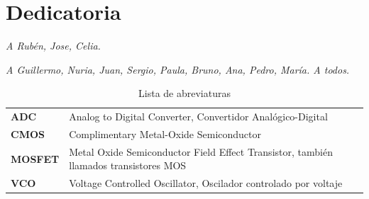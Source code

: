 \documentclass[12pt]{report} %
\begin{document}
\chapter*{Dedicatoria}

\setcounter{page}{5}
	
	\begin{center}
		\textit{A Rubén, Jose, Celia.}
	\end{center}

	\begin{center}
		\textit{A Guillermo, Nuria, Juan, Sergio, Paula, Bruno, Ana, Pedro, María. A todos.}
	\end{center}
	\vfill
	
	\newpage %
	\thispagestyle{empty}
	\mbox{}
	


\tableofcontents
\thispagestyle{fancy}


\listoffigures
\thispagestyle{fancy}


\listoftables
\thispagestyle{fancy}


\newpage
\begin{table}[h!]
	\setlength{\arrayrulewidth}{0mm}
	\begin{center}
		\caption{Lista de abreviaturas}
		\label{tab:table1}
		\begin{tabular}{>{\bf}p{4cm}|p{10cm}}
			ADC & Analog to Digital Converter, Convertidor Analógico-Digital \\
			CMOS & Complimentary Metal-Oxide Semiconductor \\
			MOSFET & Metal Oxide Semiconductor Field Effect Transistor, también llamados transistores MOS \\
			VCO & Voltage Controlled Oscillator, Oscilador controlado por voltaje \\
		\end{tabular}
	\end{center}
\end{table}

\newpage %
\thispagestyle{empty}
\mbox{}

\clearpage
{} %
\end{document}
